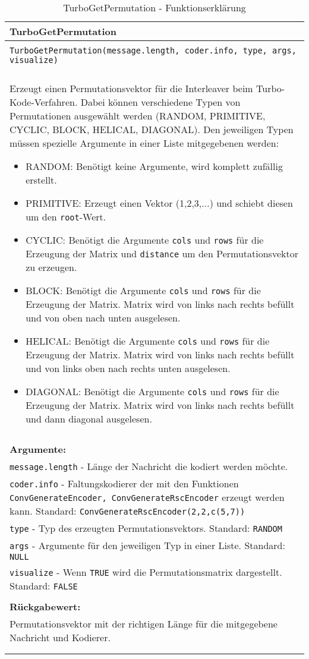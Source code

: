 \begin{longtable}{|p{\textwidth}|}
\hline
\rowcolor{lightblue}TurboGetPermutation\\
\hline
\\
\texttt{TurboGetPermutation(message.length, coder.info, type, args, visualize)}\\
\\
Erzeugt einen Permutationsvektor für die Interleaver beim Turbo-Kode-Verfahren. Dabei können verschiedene Typen von Permutationen ausgewählt werden (RANDOM, PRIMITIVE, CYCLIC, BLOCK, HELICAL, DIAGONAL). Den jeweiligen Typen müssen spezielle Argumente in einer Liste mitgegebenen werden:
\begin{itemize}
\item RANDOM: Benötigt keine Argumente, wird komplett zufällig erstellt.
\item PRIMITIVE: Erzeugt einen Vektor (1,2,3,...) und schiebt diesen um den \texttt{root}-Wert.
\item CYCLIC: Benötigt die Argumente \texttt{cols} und \texttt{rows} für die Erzeugung der Matrix und \texttt{distance} um den Permutationsvektor zu erzeugen.
\item BLOCK: Benötigt die Argumente \texttt{cols} und \texttt{rows} für die Erzeugung der Matrix. Matrix wird von links nach rechts befüllt und von oben nach unten ausgelesen.
\item HELICAL: Benötigt die Argumente \texttt{cols} und \texttt{rows} für die Erzeugung der Matrix. Matrix wird von links nach rechts befüllt und von links oben nach rechts unten ausgelesen.
\item DIAGONAL: Benötigt die Argumente \texttt{cols} und \texttt{rows} für die Erzeugung der Matrix. Matrix wird von links nach rechts befüllt und dann diagonal ausgelesen.
\end{itemize} \\
\\
\textbf{Argumente:}\\
\texttt{message.length} - Länge der Nachricht die kodiert werden möchte.\\
\texttt{coder.info} - Faltungskodierer der mit den Funktionen \texttt{ConvGenerateEncoder, ConvGenerateRscEncoder} erzeugt werden kann. Standard: \texttt{ConvGenerateRscEncoder(2,2,c(5,7))}\\
\texttt{type} - Typ des erzeugten Permutationsvektors. Standard: \texttt{RANDOM}\\
\texttt{args} - Argumente für den jeweiligen Typ in einer Liste. Standard: \texttt{NULL}\\
\texttt{visualize} - Wenn \texttt{TRUE} wird die Permutationsmatrix dargestellt. Standard: \texttt{FALSE}\\
\\
\textbf{Rückgabewert:}\\
Permutationsvektor mit der richtigen Länge für die mitgegebene Nachricht und Kodierer.\\
\\
\hline
\caption[TurboGetPermutation]{TurboGetPermutation - Funktionserklärung}
\end{longtable}